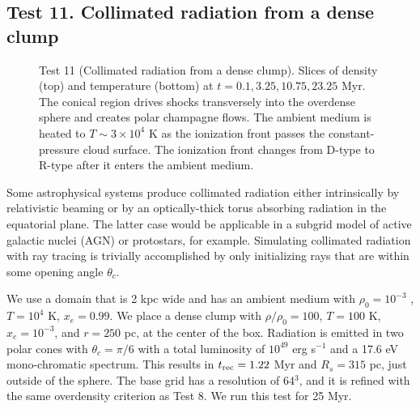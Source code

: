 \documentclass[apj,onecolumn]{emulateapj}
\begin{document}
\subsection{Test 11. Collimated radiation from a dense clump}

\begin{figure}[t]
  \caption{\label{fig:test11} Test 11 (Collimated radiation from a
    dense clump).  Slices of density (top) and temperature (bottom) at
    $t = 0.1, 3.25, 10.75, 23.25$ Myr.  The conical  region
    drives shocks transversely into the overdense sphere and creates
    polar champagne flows.  The ambient medium is heated to $T \sim 3
    \times 10^4$ K as the ionization front passes the
    constant-pressure cloud surface.  The ionization front changes
    from D-type to R-type after it enters the ambient medium.}
\end{figure}

Some astrophysical systems produce collimated radiation either
intrinsically by relativistic beaming or by an optically-thick torus
absorbing radiation in the equatorial plane.  The latter case would be
applicable in a subgrid model of active galactic nuclei (AGN) or
protostars, for example.  Simulating collimated radiation with ray
tracing is trivially accomplished by only initializing rays that are
within some opening angle $\theta_c$.

We use a domain that is 2 kpc wide and has an ambient medium with
$\rho_0 = 10^{-3}$ \cubecm, $T = 10^4$ K, $x_e = 0.99$.  We place a
dense clump with $\rho/\rho_0 = 100$, $T = 100$ K, $x_e = 10^{-3}$,
and $r = 250$ pc, at the center of the box.  Radiation is emitted in
two polar cones with $\theta_c = \pi/6$ with a total luminosity of
$10^{49}$ erg s$^{-1}$ and a 17.6 eV mono-chromatic spectrum.  This
results in $t_{\rm rec} = 1.22$ Myr and $R_s = 315$ pc, just outside
of the sphere.  The base grid has a resolution of 64$^3$, and it is
refined with the same overdensity criterion as Test 8.  We run this
test for 25 Myr.
\end{document}
